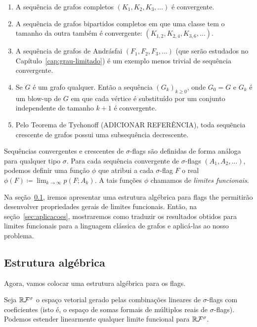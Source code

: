 \begin{example}

\begin{enumerate}
  \item A sequência de grafos completos $(K_1,K_2,K_3,\dots)$ é convergente.
  \item A sequência de grafos bipartidos completos em que uma classe tem o tamanho da outra também é convergente: $(K_{1,2},K_{2,4},K_{3,6},\dots)$.
  \item A sequência de grafos de Andrásfai $(F_1,F_2,F_3,\dots)$ (que serão estudados no Capítulo~\ref{cap:grau-limitado}) é um exemplo menos trivial de sequência convergente.
  \item Se $G$ é um grafo qualquer.
  Então a sequência $(G_k)_{k \geq 0}$, onde $G_0=G$ e $G_k$ é um blow-up de $G$ em que cada vértice é substituído por um conjunto independente de tamanho $k+1$ é convergente.
  \item Pelo Teorema de Tychonoff (ADICIONAR REFERÊNCIA), toda sequẽncia crescente de grafos possui uma subsequência decrescente.
\end{enumerate}

\end{example}

Sequências convergentes e crescentes de $\sigma$-flags são definidas de forma análoga para qualquer tipo $\sigma$.
Para cada sequência convergente de $\sigma$-flags $(A_1,A_2,\dots)$, podemos definir uma função $\phi$ que atribui a cada $\sigma$-flag $F$ o real $\phi(F) \coloneqq \lim_{k \to \infty} p(F;A_k)$.
A tais funções $\phi$ chamamos de \emph{limites funcionais}.

Na seção~\ref{sec:estrutura-algebrica}, iremos apresentar uma estrutura algébrica para flags the permitirão desenvolver propriedades gerais de limites funcionais.
Então, na seção~\ref{sec:aplicacoes}, mostraremos como traduzir os resultados obtidos para limites funcionais para a linguagem clássica de grafos e aplicá-las ao nosso problema.

\subsection{Estrutura algébrica}\label{sec:estrutura-algebrica}

Agora, vamos colocar uma estrutura algébrica para os flags.

Seja $\mathbb{R}\mathcal{F}^\sigma$ o espaço vetorial gerado pelas combinações lineares de $\sigma$-flags com coeficientes (isto é, o espaço de somas formais de múltiplos reais de $\sigma$-flags).
Podemos estender linearmente qualquer limite funcional para $\mathbb{R}\mathcal{F}^\sigma$.

